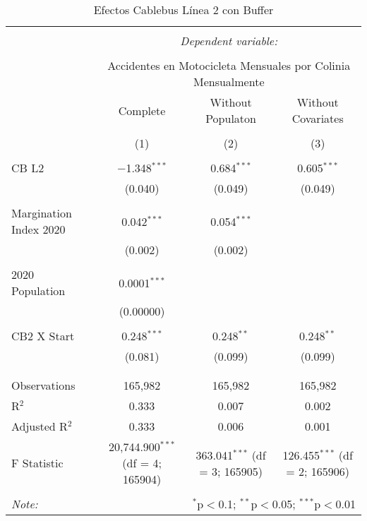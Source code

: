 
\begin{table}[!htbp] \centering 
  \caption{Efectos Cablebus Línea 2 con Buffer} 
  \label{} 
\begin{tabular}{@{\extracolsep{5pt}}lccc} 
\\[-1.8ex]\hline 
\hline \\[-1.8ex] 
 & \multicolumn{3}{c}{\textit{Dependent variable:}} \\ 
\cline{2-4} 
\\[-1.8ex] & \multicolumn{3}{c}{Accidentes en Motocicleta Mensuales por Colinia Mensualmente} \\ 
 & Complete & Without Populaton & Without Covariates \\ 
\\[-1.8ex] & (1) & (2) & (3)\\ 
\hline \\[-1.8ex] 
 CB L2 & $-$1.348$^{***}$ & 0.684$^{***}$ & 0.605$^{***}$ \\ 
  & (0.040) & (0.049) & (0.049) \\ 
  & & & \\ 
 Margination Index 2020 & 0.042$^{***}$ & 0.054$^{***}$ &  \\ 
  & (0.002) & (0.002) &  \\ 
  & & & \\ 
 2020 Population & 0.0001$^{***}$ &  &  \\ 
  & (0.00000) &  &  \\ 
  & & & \\ 
 CB2 X Start & 0.248$^{***}$ & 0.248$^{**}$ & 0.248$^{**}$ \\ 
  & (0.081) & (0.099) & (0.099) \\ 
  & & & \\ 
\hline \\[-1.8ex] 
Observations & 165,982 & 165,982 & 165,982 \\ 
R$^{2}$ & 0.333 & 0.007 & 0.002 \\ 
Adjusted R$^{2}$ & 0.333 & 0.006 & 0.001 \\ 
F Statistic & 20,744.900$^{***}$ (df = 4; 165904) & 363.041$^{***}$ (df = 3; 165905) & 126.455$^{***}$ (df = 2; 165906) \\ 
\hline 
\hline \\[-1.8ex] 
\textit{Note:}  & \multicolumn{3}{r}{$^{*}$p$<$0.1; $^{**}$p$<$0.05; $^{***}$p$<$0.01} \\ 
\end{tabular} 
\end{table} 
